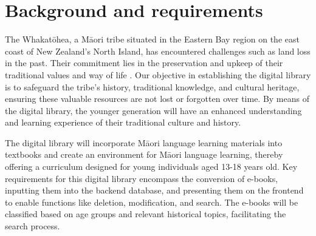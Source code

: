 \section{Background and requirements}

The Whakatōhea, a Māori tribe situated in the Eastern Bay region on the east coast of New Zealand's North Island, has encountered challenges such as land loss in the past. Their commitment lies in the preservation and upkeep of their traditional values and way of life \autocite{Whakatoh25:online}. Our objective in establishing the digital library is to safeguard the tribe's history, traditional knowledge, and cultural heritage, ensuring these valuable resources are not lost or forgotten over time. By means of the digital library, the younger generation will have an enhanced understanding and learning experience of their traditional culture and history.

The digital library will incorporate Māori language learning materials into textbooks and create an environment for Māori language learning, thereby offering a curriculum designed for young individuals aged 13-18 years old. Key requirements for this digital library encompass the conversion of e-books, inputting them into the backend database, and presenting them on the frontend to enable functions like deletion, modification, and search. The e-books will be classified based on age groups and relevant historical topics, facilitating the search process.
